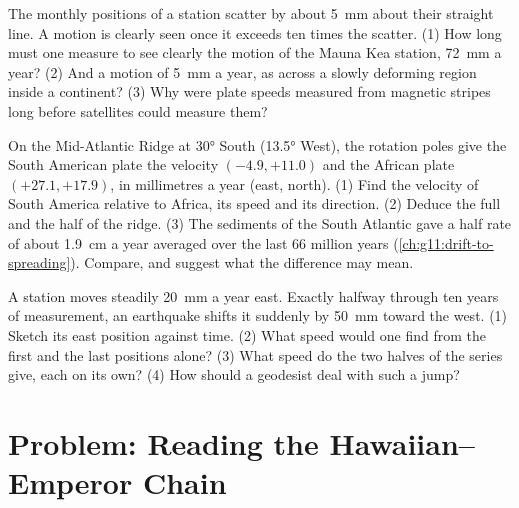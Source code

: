 \begin{exercise}[$\star\star\star$]\label{exo:g11:plate-motions:13}
The monthly positions of a station scatter by about \qty{5}{mm} about their
straight line. A motion is clearly seen once it exceeds ten times the scatter.
(1) How long must one measure to see clearly the motion of the Mauna Kea
station, \qty{72}{mm} a year? (2) And a motion of \qty{5}{mm} a year, as
across a slowly deforming region inside a continent? (3) Why were plate
speeds measured from magnetic stripes long before satellites could measure
them?
\end{exercise}

\begin{exercise}[$\star\star\star$]\label{exo:g11:plate-motions:14}
On the Mid-Atlantic Ridge at \ang{30} South (\ang{13.5} West), the rotation
poles give the South American plate the velocity $(-4.9, +11.0)$ and the
African plate $(+27.1, +17.9)$, in millimetres a year (east, north).
(1) Find the velocity of South America relative to Africa, its speed and its
direction. (2) Deduce the full and the half  of the ridge.
(3) The sediments of the South Atlantic gave a half rate of about \qty{1.9}{cm}
a year averaged over the last 66 million years
(\cref{ch:g11:drift-to-spreading}). Compare, and suggest what the difference
may mean.
\end{exercise}

\begin{exercise}[$\star\star\star$]\label{exo:g11:plate-motions:15}
A station moves steadily \qty{20}{mm} a year east. Exactly halfway through
ten years of measurement, an earthquake shifts it suddenly by \qty{50}{mm}
toward the west. (1) Sketch its east position against time. (2) What speed
would one find from the first and the last positions alone? (3) What speed do
the two halves of the series give, each on its own? (4) How should a
geodesist deal with such a jump?
\end{exercise}

\section{Problem: Reading the Hawaiian--Emperor Chain}

